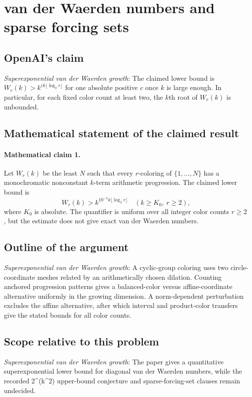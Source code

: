 \documentclass[11pt]{article}
\begin{document}
\section*{van der Waerden numbers and sparse forcing sets}

\subsection{OpenAI's claim}
\textit{Superexponential van der Waerden growth}: The claimed lower bound is $W_r(k)>k^{ck\lfloor\log_2 r\rfloor}$ for one absolute positive $c$ once $k$ is large enough. In particular, for each fixed color count at least two, the $k$th root of $W_r(k)$ is unbounded.

\subsection{Mathematical statement of the claimed result}
\paragraph{Mathematical claim 1.} Let $W_r(k)$ be the least $N$ such that every $r$-coloring of $\{1,\ldots,N\}$ has a monochromatic nonconstant $k$-term arithmetic progression. The claimed lower bound is \[W_r(k)>k^{10^{-5}k\lfloor\log_2r\rfloor}\quad(k\ge K_0,\ r\ge2),\] where $K_0$ is absolute. The quantifier is uniform over all integer color counts $r\ge2$, but the estimate does not give exact van der Waerden numbers.

\subsection{Outline of the argument}
\textit{Superexponential van der Waerden growth}: A cyclic-group coloring uses two circle-coordinate meshes related by an arithmetically chosen dilation. Counting anchored progression patterns gives a balanced-color versus affine-coordinate alternative uniformly in the growing dimension. A norm-dependent perturbation excludes the affine alternative, after which interval and product-color transfers give the stated bounds for all color counts.

\subsection{Scope relative to this problem}
\textit{Superexponential van der Waerden growth}: The paper gives a quantitative superexponential lower bound for diagonal van der Waerden numbers, while the recorded 2\textasciicircum{}(k\textasciicircum{}2) upper-bound conjecture and sparse-forcing-set clauses remain undecided.
\end{document}
